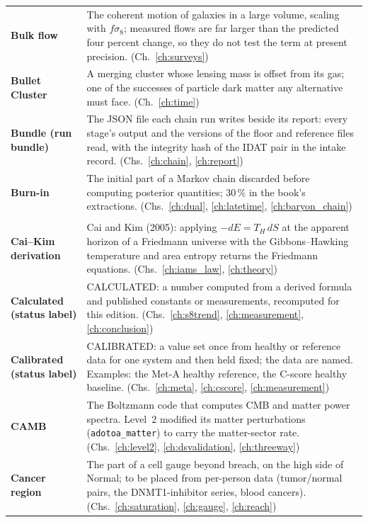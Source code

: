 {\begin{longtable}{@{}>{\raggedright\arraybackslash}p{}>{\raggedright\arraybackslash}p{}@{}}
\textbf{Bulk flow} & The coherent motion of galaxies in a large volume, scaling with $f\sigma_8$; measured flows are far larger than the predicted four percent change, so they do not test the term at present precision. {\footnotesize(Ch.~\ref{ch:surveys})}\\[1pt]
\textbf{Bullet Cluster} & A merging cluster whose lensing mass is offset from its gas; one of the successes of particle dark matter any alternative must face. {\footnotesize(Ch.~\ref{ch:time})}\\[1pt]
\textbf{Bundle (run bundle)} & The JSON file each chain run writes beside its report: every stage's output and the versions of the floor and reference files read, with the integrity hash of the IDAT pair in the intake record. {\footnotesize(Chs.~\ref{ch:chain}, \ref{ch:report})}\\[1pt]
\textbf{Burn-in} & The initial part of a Markov chain discarded before computing posterior quantities; 30\,\% in the book's extractions. {\footnotesize(Chs.~\ref{ch:dual}, \ref{ch:latetime}, \ref{ch:baryon_chain})}\\[1pt]
\multicolumn{2}{@{}l}{\normalsize\textbf{C}}\\[2pt]
\textbf{Cai--Kim derivation} & Cai and Kim (2005): applying $-dE=T_H\,dS$ at the apparent horizon of a Friedmann universe with the Gibbons--Hawking temperature and area entropy returns the Friedmann equations. {\footnotesize(Chs.~\ref{ch:iams_law}, \ref{ch:theory})}\\[1pt]
\textbf{Calculated (status label)} & CALCULATED: a number computed from a derived formula and published constants or measurements, recomputed for this edition. {\footnotesize(Chs.~\ref{ch:s8trend}, \ref{ch:measurement}, \ref{ch:conclusion})}\\[1pt]
\textbf{Calibrated (status label)} & CALIBRATED: a value set once from healthy or reference data for one system and then held fixed; the data are named. Examples: the Met-A healthy reference, the C-score healthy baseline. {\footnotesize(Chs.~\ref{ch:meta}, \ref{ch:cscore}, \ref{ch:measurement})}\\[1pt]
\textbf{CAMB} & The Boltzmann code that computes CMB and matter power spectra. Level~2 modified its matter perturbations (\texttt{adotoa\_matter}) to carry the matter-sector rate. {\footnotesize(Chs.~\ref{ch:level2}, \ref{ch:dsvalidation}, \ref{ch:threeway})}\\[1pt]
\textbf{Cancer region} & The part of a cell gauge beyond breach, on the high side of Normal; to be placed from per-person data (tumor/normal pairs, the DNMT1-inhibitor series, blood cancers). {\footnotesize(Chs.~\ref{ch:saturation}, \ref{ch:gauge}, \ref{ch:reach})}\\[1pt]

\end{longtable}}
